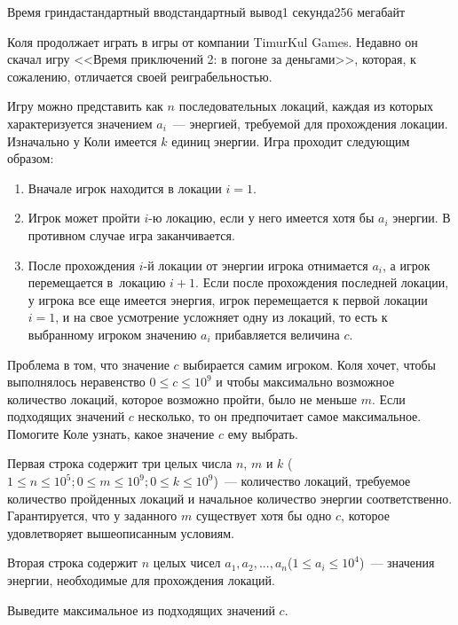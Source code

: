\begin{problem}{Время гринда}{стандартный ввод}{стандартный вывод}{1 секунда}{256 мегабайт}

Коля продолжает играть в игры от компании TimurKul Games. Недавно он скачал игру <<Время приключений 2: в погоне за деньгами>>, которая, к сожалению, отличается своей реиграбельностью.

Игру можно представить как $n$ последовательных локаций, каждая из которых характеризуется значением $a_i$~--- энергией, требуемой для прохождения локации. Изначально у Коли имеется $k$ единиц энергии. Игра проходит следующим образом:

\begin{enumerate}
\item Вначале игрок находится в локации $i = 1$.
\item Игрок может пройти $i$-ю локацию, если у него имеется хотя бы $a_i$ энергии. В противном случае игра заканчивается.
\item После прохождения $i$-й локации от энергии игрока отнимается $a_i$, а игрок перемещается в~локацию $i + 1$. Если после прохождения последней локации, у игрока все еще имеется энергия, игрок перемещается к первой локации $i = 1$, и на свое усмотрение усложняет одну из локаций, то есть к выбранному игроком значению $a_i$ прибавляется величина $c$.
\end{enumerate}

Проблема в том, что значение $c$ выбирается самим игроком. Коля хочет, чтобы выполнялось неравенство $0 \leq c \leq 10^9$ и чтобы максимально возможное количество локаций, которое возможно пройти, было не меньше $m$. Если подходящих значений $c$ несколько, то он предпочитает самое максимальное. Помогите Коле узнать, какое значение $c$ ему выбрать.

\InputFile
Первая строка содержит три целых числа $n$, $m$ и $k$ ($1 \leq n \leq 10^5; 0 \leq m \leq 10^9; 0 \leq k \leq 10^9$)~--- количество локаций, требуемое количество пройденных локаций и начальное количество энергии соответственно. Гарантируется, что у заданного $m$ существует хотя бы одно $c$, которое удовлетворяет вышеописанным условиям.

Вторая строка содержит $n$ целых чисел $a_1,a_2,...,a_n$($1 \leq a_i \leq 10^4$)~--- значения энергии, необходимые для прохождения локаций.

\OutputFile
Выведите максимальное из подходящих значений $c$.

\Examples

\begin{example}
%
%
%
\end{example}


\end{problem}

